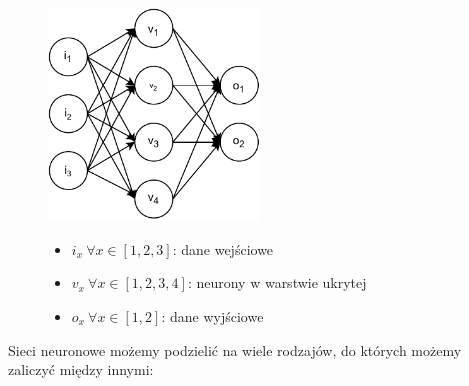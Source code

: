 \begin{figure}[H]
    \centering
    \includegraphics[width=0.5\textwidth]{images/neural-network}
    \begin{itemize}
        \item[] $i_x \ \forall x \in [1, 2, 3]$: dane wejściowe
        \item[] $v_x \ \forall x \in [1, 2, 3, 4]$: neurony w warstwie ukrytej
        \item[] $o_x \ \forall x \in [1, 2]$: dane wyjściowe
    \end{itemize}
    \label{fig:neural-network}
\end{figure}
\pagebreak
Sieci neuronowe możemy podzielić na wiele rodzajów, do których możemy zaliczyć między innymi:
